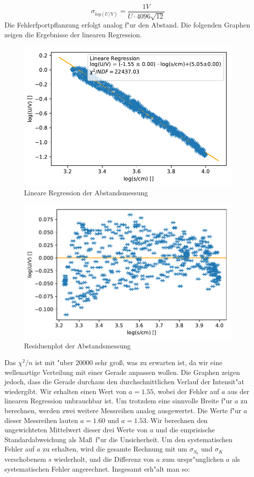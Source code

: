 \documentclass[12pt,a4paper]{article}
\begin{document}
\begin{equation}
\sigma_{log(U/V)}=\frac{1V}{U\cdot4096\sqrt{12}}
\end{equation}
Die Fehlerfportpflanzung erfolgt analog f"ur den Abstand.
Die folgenden Graphen zeigen die Ergebnisse der linearen Regression.
\begin{figure}[H]
	\centering
	\includegraphics[scale=1]{Python/Abstand3_LinReg.pdf}
	\caption{Lineare Regression der Abstandsmessung}
\end{figure}
\begin{figure}[H]
	\centering
	\includegraphics[scale=1]{Python/Abstand3_Residuen.pdf}
	\caption{Residuenplot der Abstandsmessung}
	\label{Abstandsabh_Residuenplot}
\end{figure}
Das $\chi^2/n$ ist mit "uber 20000 sehr gro\ss, was zu erwarten ist, da wir eine wellenartige Verteilung mit einer Gerade anpassen wollen. Die Graphen zeigen jedoch, dass die Gerade durchaus den durchschnittlichen Verlauf der Intensit"at wiedergibt. Wir erhalten einen Wert von $a=1.55$, wobei der Fehler auf $a$ aus der linearen Regression unbrauchbar ist. Um trotzdem eine sinnvolle Breite f"ur $a$ zu berechnen, werden zwei weitere Messreihen analog ausgewertet. Die Werte f"ur $a$ dieser Messreihen lauten $a=1.60$ und $a=1.53$. Wir berechnen den ungewichteten Mittelwert dieser drei Werte von $a$ und die emprisische Standardabweichung als Ma\ss\  f"ur die Unsicherheit. Um den systematischen Fehler auf $a$ zu erhalten, wird die gesamte Rechnung mit um $\sigma_{S_0}$ und $\sigma_{K}$ verschobenem $s$ wiederholt, und die Differenz von $a$ zum urspr"unglichen $a$ als systematischen Fehler angerechnet. Insgesamt erh"alt man so:
\end{document}
